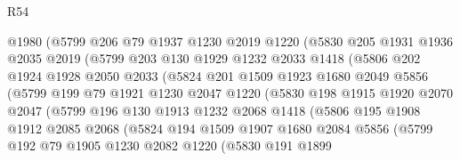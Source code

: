 \begin{lexlean}{R54}
\begin{coremodule}
                @1980
                (@5799
                  @206
                  @79
                  @1937
                  @1230
                  @2019
                  @1220
                  (@5830
                    @205
                    @1931
                    @1936
                    @2035
                    @2019
                    (@5799
                      @203
                      @130
                      @1929
                      @1232
                      @2033
                      @1418
                      (@5806
                        @202
                        @1924
                        @1928
                        @2050
                        @2033
                        (@5824
                          @201
                          @1509
                          @1923
                          @1680
                          @2049
                          @5856
                          (@5799
                            @199
                            @79
                            @1921
                            @1230
                            @2047
                            @1220
                            (@5830
                              @198
                              @1915
                              @1920
                              @2070
                              @2047
                              (@5799
                                @196
                                @130
                                @1913
                                @1232
                                @2068
                                @1418
                                (@5806
                                  @195
                                  @1908
                                  @1912
                                  @2085
                                  @2068
                                  (@5824
                                    @194
                                    @1509
                                    @1907
                                    @1680
                                    @2084
                                    @5856
                                    (@5799
                                      @192
                                      @79
                                      @1905
                                      @1230
                                      @2082
                                      @1220
                                      (@5830
                                        @191
                                        @1899

\end{coremodule}
\end{lexlean}
